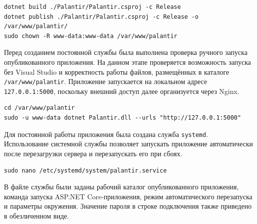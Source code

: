 \begin{code}
\vspace{-0.75cm}
\begin{verbatim}
dotnet build ./Palantir/Palantir.csproj -c Release
dotnet publish ./Palantir/Palantir.csproj -c Release -o /var/www/palantir/
sudo chown -R www-data:www-data /var/www/palantir
\end{verbatim}
\end{code}

Перед созданием постоянной службы была выполнена проверка ручного запуска опубликованного приложения. На данном этапе проверяется возможность запуска без Visual Studio и корректность работы файлов, размещённых в каталоге \texttt{/var/www/palantir}. Приложение запускается на локальном адресе \texttt{127.0.0.1:5000}, поскольку внешний доступ далее организуется через Nginx.

\begin{code}
\vspace{-0.75cm}
\begin{verbatim}
cd /var/www/palantir
sudo -u www-data dotnet Palantir.dll --urls "http://127.0.0.1:5000"
\end{verbatim}
\end{code}

Для постоянной работы приложения была создана служба \texttt{systemd}. Использование системной службы позволяет запускать приложение автоматически после перезагрузки сервера и перезапускать его при сбоях.

\begin{code}
\vspace{-0.75cm}
\begin{verbatim}
sudo nano /etc/systemd/system/palantir.service
\end{verbatim}
\end{code}

В файле службы были заданы рабочий каталог опубликованного приложения, команда запуска ASP.NET Core-приложения, режим автоматического перезапуска и параметры окружения. Значение пароля в строке подключения также приведено в обезличенном виде.

